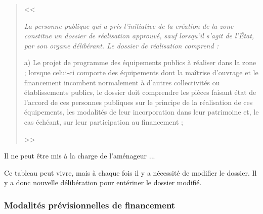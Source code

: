 		\begin{quote}
			<< {\itshape La personne publique qui a pris l'initiative de la création de la zone constitue un dossier de réalisation approuvé, sauf lorsqu'il s'agit de l'État, par son organe délibérant. Le dossier de réalisation comprend :
				
				a) Le projet de programme des équipements publics à réaliser dans la zone ; lorsque celui-ci comporte des équipements dont la maîtrise d'ouvrage et le financement incombent normalement à d'autres collectivités ou établissements publics, le dossier doit comprendre les pièces faisant état de l'accord de ces personnes publiques sur le principe de la réalisation de ces équipements, les modalités de leur incorporation dans leur patrimoine et, le cas échéant, sur leur participation au financement ;
				
				\lips
				
%				
%				
%				
			} >>
		\end{quote}
		
		Il ne peut être mis à la charge de l'aménageur ... 
		
		Ce tableau peut vivre, mais à chaque fois il y a nécessité de modifier le dossier. Il y a donc nouvelle délibération pour entériner le dossier modifié.
		
		
		
		\subsubsection{Modalités prévisionnelles de financement}
		
